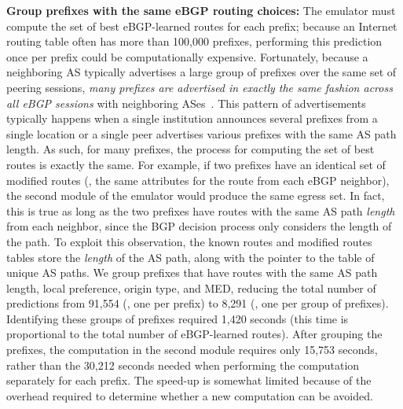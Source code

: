 \textbf{Group prefixes with the same eBGP routing choices:} The emulator
must compute the set of best eBGP-learned routes for each prefix;
because an Internet routing table often has more than 100,000 prefixes,
performing this prediction once per prefix could be computationally
expensive.  Fortunately, because a neighboring AS typically advertises a
large group of prefixes over the same set of peering sessions, {\em many
prefixes are advertised in exactly the same fashion across all eBGP
sessions} with neighboring ASes~\cite{Feamster2003e}.  This pattern of
advertisements typically 
happens when a single institution announces several prefixes from a
single location or a single peer advertises various prefixes with the
same AS path length.  As such, for many prefixes, the
process for computing the set of best 
routes is exactly the same.  For example,
if two prefixes have an identical set of {\dfc modified routes} (\ie,
the same attributes for the route from each eBGP neighbor), the second
module of the emulator would produce the same egress set.  In fact, this
is true as long as the two prefixes have routes with the same AS path
{\em length\/} from each neighbor, since the BGP decision process only
considers the length of the path.  To exploit this observation, the {\mf
known routes} and {\dfc modified routes} tables store the {\em length\/}
of the AS path, along with the pointer to the table of unique AS paths.
We group prefixes that have routes with the same AS path length, local
preference, origin type, and MED, reducing the total number of
predictions from 91,554 (\ie, one per prefix) to 8,291 (\ie, one per
group of prefixes).
%
Identifying these groups of prefixes required 1,420 seconds (this time
is proportional to the total number of eBGP-learned routes).
After grouping the prefixes, the computation in the second module
requires only 15,753 seconds, rather than the 30,212 seconds needed
when performing the computation separately for each prefix.  The
speed-up is somewhat limited because of the overhead 
required to determine whether a new computation can be
avoided.



